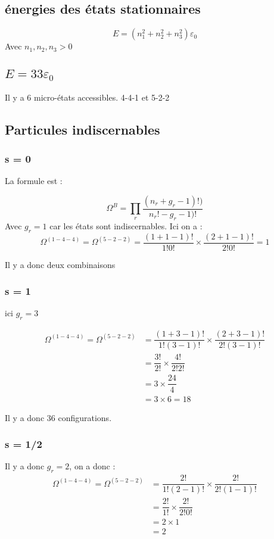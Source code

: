 \documentclass[12pt,a4paper]{article}
\begin{document}
\subsection{énergies des états stationnaires}

\[
	E = (n_1^2 + n_2^2 +n_3^2)\varepsilon_0
\]
Avec \(n_1, n_2, n_3 > 0\)

\subsection{\(E = 33\varepsilon_0\)}

Il y a 6 micro-états accessibles. 4-4-1 et 5-2-2

\subsection{Particules indiscernables}

\subsubsection{s = 0}
La formule est :

\[
	\Omega^B = \prod_r \dfrac{(n_r + g_r -1)!)}{n_r!-g_r-1)!}
\]
Avec \(g_r = 1\) car les états sont indiscernables.
Ici on a :
\[
	\Omega^{(1-4-4)} = \Omega^{(5-2-2)} = \dfrac{(1+1-1)!}{1!0!} \times \dfrac{(2+1-1)!}{2!0!} = 1
\]

Il y a donc deux combinaisons

\subsubsection{s = 1}

ici \(g_r = 3\)

\begin{align*}
	\Omega^{(1-4-4)} = \Omega^{(5-2-2)} &= \dfrac{(1+3-1)!}{1!(3-1)!} \times \dfrac{(2+3-1)!}{2!(3-1)!}\\
	&= \dfrac{3!}{2!} \times \dfrac{4!}{2!2!}\\
	&= 3 \times \dfrac{24}{4}\\
	&= 3 \times 6 = 18
\end{align*}

Il y a donc 36 configurations.

\subsubsection{s = 1/2}

Il y a donc \(g_r = 2\), on a donc :
\begin{align*}
	\Omega^{(1-4-4)} = \Omega^{(5-2-2)} &= \dfrac{2!}{1!(2-1)!} \times \dfrac{2!}{2!(1-1)!}\\
	&= \dfrac{2!}{1!} \times \dfrac{2!}{2!0!}\\
	&= 2 \times 1\\
	&= 2
\end{align*}
\end{document}
